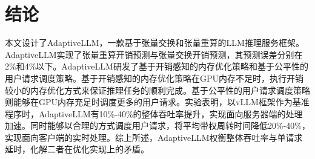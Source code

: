 \section{结论}

本文设计了AdaptiveLLM，一款基于张量交换和张量重算的LLM推理服务框架。AdaptiveLLM实现了张量重算开销预测与张量交换开销预测，其预测误差分别在2\%和4\%以下。AdaptiveLLM研发了基于开销感知的内存优化策略和基于公平性的用户请求调度策略。基于开销感知的内存优化策略在GPU内存不足时，执行开销较小的内存优化方式来保证推理任务的顺利完成。基于公平性的用户请求调度策略则能够在GPU内存充足时调度更多的用户请求。实验表明，以vLLM框架作为基准程序时，AdaptiveLLM有10\%-40\%的整体吞吐率提升，实现面向服务器端的处理加速。同时能够以合理的方式调度用户请求，将平均带权周转时间降低20\%-40\%，实现面向客户端的实时处理。综上所述，AdaptiveLLM权衡整体吞吐率与单请求延时，化解二者在优化实现上的矛盾。